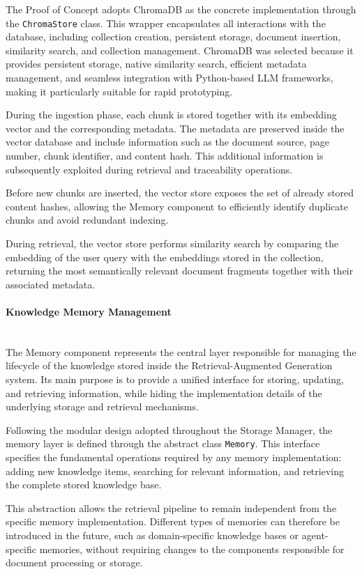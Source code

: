 The Proof of Concept adopts ChromaDB as the concrete implementation through the \texttt{ChromaStore} class. This wrapper encapsulates all interactions with the database, including collection creation, persistent storage, document insertion, similarity search, and collection management. ChromaDB was selected because it provides persistent storage, native similarity search, efficient metadata management, and seamless integration with Python-based LLM frameworks, making it particularly suitable for rapid prototyping.

During the ingestion phase, each chunk is stored together with its embedding vector and the corresponding metadata. The metadata are preserved inside the vector database and include information such as the document source, page number, chunk identifier, and content hash. This additional information is subsequently exploited during retrieval and traceability operations.

Before new chunks are inserted, the vector store exposes the set of already stored content hashes, allowing the Memory component to efficiently identify duplicate chunks and avoid redundant indexing.

During retrieval, the vector store performs similarity search by comparing the embedding of the user query with the embeddings stored in the collection, returning the most semantically relevant document fragments together with their associated metadata.


\paragraph{Knowledge Memory Management}~\\

The Memory component represents the central layer responsible for managing the lifecycle of the knowledge stored inside the Retrieval-Augmented Generation system. Its main purpose is to provide a unified interface for storing, updating, and retrieving information, while hiding the implementation details of the underlying storage and retrieval mechanisms.

Following the modular design adopted throughout the Storage Manager, the memory layer is defined through the abstract class \texttt{Memory}. This interface specifies the fundamental operations required by any memory implementation: adding new knowledge items, searching for relevant information, and retrieving the complete stored knowledge base.

This abstraction allows the retrieval pipeline to remain independent from the specific memory implementation. Different types of memories can therefore be introduced in the future, such as domain-specific knowledge bases or agent-specific memories, without requiring changes to the components responsible for document processing or storage.

